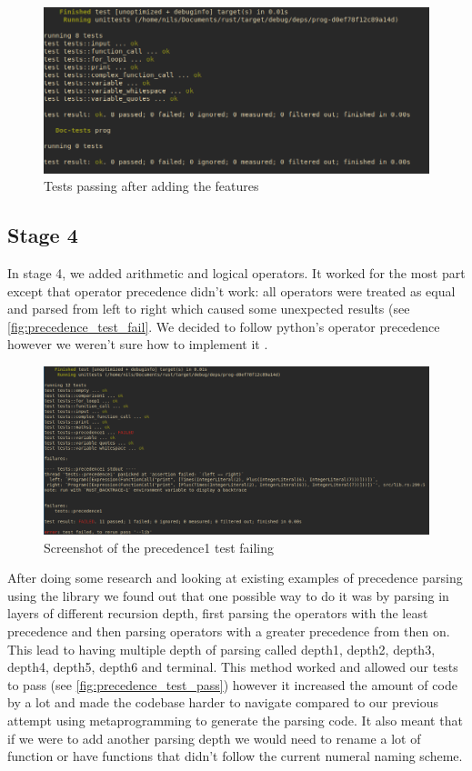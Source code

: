 \documentclass{article}
\begin{document}
\begin{figure}
	\includegraphics[width=\textwidth]{stage3_test}
	\caption{Tests passing after adding the features}
	\label{fig:stage3_test}
\end{figure}

\subsection{Stage 4}

In stage 4, we added arithmetic and logical operators. It worked for the most
part except that operator precedence didn't work: all operators were treated as
equal and parsed from left to right which caused some unexpected results (see
\autoref{fig:precedence_test_fail}. We decided to follow python's operator
precedence however we weren't sure how to implement it
\cite{python_precedence}.

\begin{figure}
	\includegraphics[width=\textwidth]{precedence_test_fail}
	\caption{Screenshot of the precedence1 test failing}
	\label{fig:precedence_test_fail}
\end{figure}

After doing some research and looking at existing examples of precedence
parsing using the  library we found out that one possible way to
do it was by parsing in layers of different recursion depth, first parsing the
operators with the least precedence and then parsing operators with a greater
precedence from then on. This lead to having multiple depth of parsing called
depth1, depth2, depth3, depth4, depth5, depth6 and terminal. This method worked
and allowed our tests to pass (see \autoref{fig:precedence_test_pass}) however
it increased the amount of code by a lot and made the codebase harder to
navigate compared to our previous attempt using metaprogramming to generate the
parsing code. It also meant that if we were to add another parsing depth we
would need to rename a lot of function or have functions that didn't follow the
current numeral naming scheme.
\end{document}
